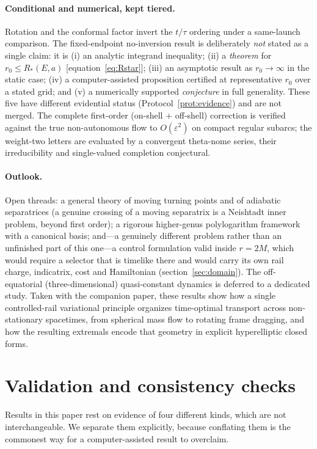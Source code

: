 \documentclass[12pt]{iopart}
\theoremstyle{plain}
\theoremstyle{definition}
\theoremstyle{remark}
\begin{document}
\paragraph{Conditional and numerical, kept tiered.} Rotation and the conformal factor
invert the $t/\tau$ ordering under a same-launch comparison. The fixed-endpoint
no-inversion result is deliberately \emph{not} stated as a single claim: it is
(i) an analytic integrand inequality; (ii) a \emph{theorem} for
$r_0\le R_\ast(E,a)$ [equation~\eqref{eq:Rstar}]; (iii) an asymptotic result as
$r_0\to\infty$ in the static case; (iv) a computer-assisted proposition certified at
representative $r_0$ over a stated grid; and (v) a numerically supported \emph{conjecture}
in full generality. These five have different evidential status
(Protocol~\ref{prot:evidence}) and are not merged. The complete first-order (on-shell
$+$ off-shell) correction is verified against the true non-autonomous flow to
$O(\varepsilon^2)$ on compact regular subarcs; the weight-two letters are evaluated by a
convergent theta-nome series, their irreducibility and single-valued completion
conjectural.

\paragraph{Outlook.} Open threads: a general theory of moving turning points and of
adiabatic separatrices (a genuine crossing of a moving separatrix is a Neishtadt inner
problem, beyond first order); a rigorous higher-genus polylogarithm framework with a
canonical basis; and---a genuinely different problem rather than an unfinished part of
this one---a control formulation valid inside $r=2M$, which would require a selector that
is timelike there and would carry its own rail charge, indicatrix, cost and Hamiltonian
(section~\ref{sec:domain}). The off-equatorial
(three-dimensional) quasi-constant dynamics is deferred to a dedicated study.
Taken with the companion paper, these results show how a single controlled-rail
variational principle organizes time-optimal transport across non-stationary spacetimes,
from spherical mass flow to rotating frame dragging, and how the resulting extremals
encode that geometry in explicit hyperelliptic closed forms.


\appendix
\section{Validation and consistency checks}
\label{app:validation}
Results in this paper rest on evidence of four different kinds, which are not
interchangeable. We separate them explicitly, because conflating them is the
commonest way for a computer-assisted result to overclaim.
\end{document}
